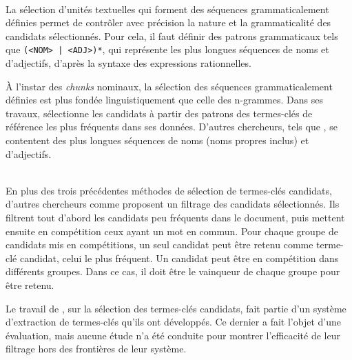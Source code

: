     \begin{example}
    \end{example}

    ~\\La sélection d'unités textuelles qui forment des séquences
    grammaticalement définies permet de contrôler
    avec précision la nature et la grammaticalité des candidats sélectionnés.
    Pour cela, il faut définir des patrons grammaticaux tels que \texttt{(<NOM>
    | <ADJ>)*}, qui représente les plus longues séquences de noms et
    d'adjectifs, d'après la syntaxe des expressions rationnelles.

    À l'instar des \textit{chunks} nominaux, la sélection des séquences
    grammaticalement définies est plus fondée linguistiquement que celle des
    n-grammes. Dans ses travaux, 
    sélectionne les candidats à partir des patrons des termes-clés de référence
    les plus fréquents dans ses données. D'autres chercheurs,
    tels que , se contentent des plus longues
    séquences de noms (noms propres inclus) et d'adjectifs.

    \begin{example}
    \end{example}

    ~\\En plus des trois précédentes méthodes de sélection de termes-clés
    candidats, d'autres chercheurs comme
     proposent un filtrage
    des candidats sélectionnés.
    Ils filtrent tout d'abord les candidats peu fréquents dans le document, puis
    mettent ensuite en compétition ceux ayant un mot en commun. Pour chaque
    groupe de candidats mis en compétitions, un seul candidat peut être retenu
    comme terme-clé candidat, celui le plus fréquent. Un candidat peut être en
    compétition dans différents groupes. Dans ce cas, il doit être le
    \og{}vainqueur\fg{} de chaque groupe pour être retenu.

    Le travail de , sur la
    sélection des termes-clés candidats, fait partie d'un système d'extraction
    de termes-clés qu'ils ont développés. Ce dernier a fait l'objet d'une
    évaluation, mais aucune étude n'a été conduite pour montrer l'efficacité de
    leur filtrage hors des frontières de leur système.

